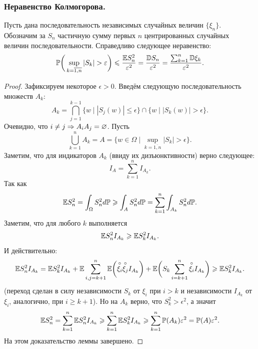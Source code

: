 \subsubsection{Неравенство Колмогорова.}
\begin{lemma}
    Пусть дана последовательность независимых случайных величин $\{\xi_n\}$.
    Обозначим за $S_n$ частичную сумму первых $n$ центрированных случайных величин последовательности.
    Справедливо следующее неравенство:
    \[
        \mathbb{P}\biggr(\sup\limits_{k = \overline{1, n}}|S_k| > \varepsilon\biggr) \leqslant \dfrac{\mathbb{E} S_n^2}{\varepsilon^2} = \dfrac{\mathbb{D} S_n}{\varepsilon^2} = \dfrac{\sum_{k = 1}^{n} \mathbb{D} \xi_k}{\varepsilon^2}.
    \]
\end{lemma}
\begin{proof}
    Зафиксируем некоторое $\epsilon > 0$.
    Введём следующую последовательность множеств $A_k$:
    \[
        A_k = \bigcap\limits_{j = 1}^{k - 1}\{w \mid |S_j(w)| \leq \epsilon\} \cap \{w \mid|S_{k}(w)| > \epsilon \}.
    \]
    Очевидно, что $i \neq j \Rightarrow A_{i}A_j = \varnothing$.
    Пусть
    \[
        \bigcup\limits_{k = 1}^n A_k = A = \{w \in \Omega \mid \sup\limits_{k = \overline{1, n}} |S_k| > \epsilon\}.
    \]
    Заметим, что для индикаторов $A_k$ (ввиду их дизъюнктивности) верно следующее:
    \[
        I_{A} = \sum\limits_{k = 1}^n I_{A_k}.
    \]
    Так как
    \[
        \mathbb{E} S_n^2 = \int_{\Omega} S^2_n d\mathbb{P} \geqslant \int_{A} S^2_n d\mathbb{P} = \sum\limits_{k = 1}^{n} \int_{A_k} S^2_n d\mathbb{P}.
    \]
    Заметим, что для любого $k$ выполняется
    \[
        \mathbb{E} S_n^2 I_{A_k} \geqslant \mathbb{E} S_{k}^2 I_{A_k}.
    \]
    И действительно:
    \[
        \mathbb{E} S_n^2 I_{A_k} = \mathbb{E} S_k^2 I_{A_k} + \mathbb{E} \sum\limits_{i, j = k + 1}^{n} \mathbb{E} \biggr(\overset{\circ}{\xi_i} \overset{\circ}{\xi_j} I_{A_k}\biggr) + \mathbb{E} \biggr( S_k \sum\limits_{i = k + 1}^{n} \overset{\circ}{\xi_i} I_{A_k}\biggr) \geqslant \mathbb{E} S_k^2 I_{A_k}.
    \]
    (переход сделан в силу независимости $S_k$ от $\xi_{i}$ при $i > k$ и независимости $I_{A_k}$ от $\xi_{i}$, аналогично, при $i \geq k + 1$).
    Но на $A_k$ верно, что $S_k^2 > \epsilon^2$, а значит
    \[
        \mathbb{E} S_n^2 = \sum\limits_{k = 1}^{n} \mathbb{E} S_n^2 I_{A_k} \geqslant \sum\limits_{k = 1}^{n} \mathbb{E} S_k^2 I_{A_k} \geqslant \sum\limits_{k = 1}^{n} \mathbb{P}(A_k)\varepsilon^2 = \mathbb{P}(A) \varepsilon^2.
    \]
    На этом доказательство леммы завершено.
\end{proof}
